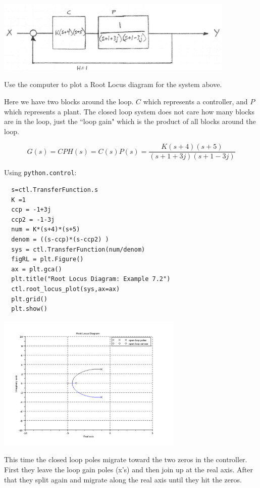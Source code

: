 \begin{ExampleSmall}\label{contplantrootlocus}


\includegraphics[width=4.5in]{figs07/00780a.png}


Use the computer to plot a Root Locus diagram for the system above.

Here we have two blocks around the loop.  $C$ which represents a controller, and $P$ which represents a plant.  The closed loop system does not care how many blocks are in the loop, just the ``loop gain" which is the product of all blocks around the loop.

\[
G(s) = CPH(s) = C(s)P(s) = \frac {K(s+4)(s+5)}   {(s+1+3j)(s+1-3j)}
\]

\vspace{0.25in}
Using {\tt python.control}:


\begin{verbatim}
  s=ctl.TransferFunction.s
  K =1
  ccp = -1+3j
  ccp2 = -1-3j
  num = K*(s+4)*(s+5)
  denom = ((s-ccp)*(s-ccp2) )
  sys = ctl.TransferFunction(num/denom)
  figRL = plt.Figure()
  ax = plt.gca()
  plt.title("Root Locus Diagram: Example 7.2")
  ctl.root_locus_plot(sys,ax=ax)
  plt.grid()
  plt.show()
\end{verbatim}

\includegraphics[width=3.5in]{figs07/rlexample2a.png}

This time the closed loop poles migrate toward the two zeros in the controller.  First they leave the loop gain poles (x's) and then join up at the real axis. After that  they split again and migrate along the real axis until they hit the zeros.
\end{ExampleSmall}







